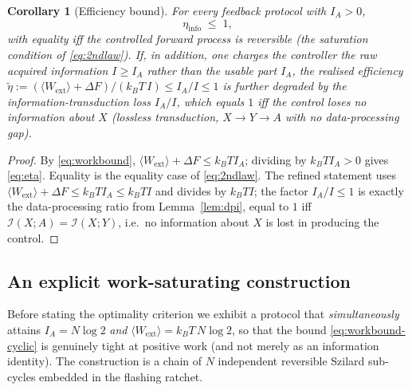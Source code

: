 \documentclass{amsart}
\newtheorem{corollary}{Corollary}
\theoremstyle{definition}
\newcommand{\kB}{k_{B}}
\newcommand{\Wext}{\langle W_{\mathrm{ext}}\rangle}
\begin{document}
\begin{corollary}[Efficiency bound]\label{cor:eff}
For every feedback protocol with $I_A>0$,
\begin{equation}\label{eq:eta}
\eta_{\mathrm{info}} \;\le\; 1,
\end{equation}
with equality iff the controlled forward process is reversible (the saturation
condition of \eqref{eq:2ndlaw}). If, in addition, one charges the controller
the raw acquired information $I\ge I_A$ rather than the usable part $I_A$, the
realised efficiency
$\tilde\eta:=(\Wext+\Delta F)/(\kB T\,I)\le I_A/I\le1$ is further degraded by
the information-transduction loss $I_A/I$, which equals $1$ iff the control
loses no information about $X$ (lossless transduction, $X\to Y\to A$ with no
data-processing gap).
\end{corollary}

\begin{proof}
By \eqref{eq:workbound}, $\Wext+\Delta F\le \kB T I_A$; dividing by
$\kB T I_A>0$ gives \eqref{eq:eta}. Equality is the equality case of
\eqref{eq:2ndlaw}. The refined statement uses $\Wext+\Delta F\le\kB T I_A\le
\kB T I$ and divides by $\kB T I$; the factor $I_A/I\le1$ is exactly the
data-processing ratio from Lemma~\ref{lem:dpi}, equal to $1$ iff
$\mathcal I(X;A)=\mathcal I(X;Y)$, i.e.\ no information about $X$ is lost in
producing the control.
\end{proof}

\subsection{An explicit work-saturating construction}

Before stating the optimality criterion we exhibit a protocol that
\emph{simultaneously} attains $I_A=N\log2$ \emph{and} $\Wext=\kB T\,N\log2$,
so that the bound \eqref{eq:workbound-cyclic} is genuinely tight at positive
work (and not merely as an information identity). The construction is a chain
of $N$ independent reversible Szilard sub-cycles embedded in the flashing
ratchet.
\end{document}
